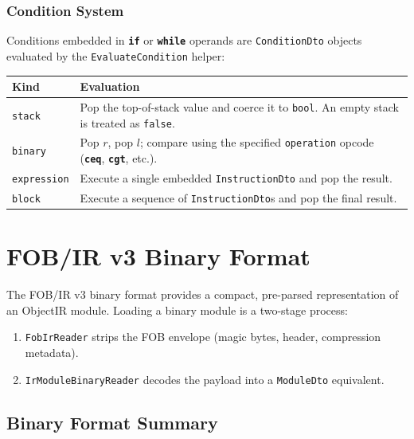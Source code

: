 \documentclass[11pt,a4paper]{article}
\newcommand{\code}[1]{\texttt{\small #1}}
\newcommand{\typename}[1]{\textcolor{typecolor}{\texttt{\small #1}}}
\newcommand{\opcode}[1]{\textbf{\texttt{#1}}}
\begin{document}
\subsubsection{Condition System}
\label{sec:conditions}

Conditions embedded in \opcode{if} or \opcode{while} operands are
\typename{ConditionDto} objects evaluated by the \code{EvaluateCondition}
helper:

\begin{longtable}{lp{10cm}}
  \toprule
  \textbf{Kind}       & \textbf{Evaluation} \\
  \midrule
  \endhead
  \code{stack}      & Pop the top-of-stack value and coerce it to \texttt{bool}.
                      An empty stack is treated as \texttt{false}. \\
  \code{binary}     & Pop $r$, pop $l$; compare using the specified
                      \code{operation} opcode (\opcode{ceq}, \opcode{cgt}, etc.). \\
  \code{expression} & Execute a single embedded \typename{InstructionDto} and pop
                      the result. \\
  \code{block}      & Execute a sequence of \typename{InstructionDto}s and pop the
                      final result. \\
  \bottomrule
\end{longtable}

\section{FOB/IR v3 Binary Format}
\label{sec:fob}

The FOB/IR v3 binary format provides a compact, pre-parsed representation of
an ObjectIR module. Loading a binary module is a two-stage process:

\begin{enumerate}[leftmargin=2em]
  \item \typename{FobIrReader} strips the FOB envelope (magic bytes, header,
    compression metadata).
  \item \typename{IrModuleBinaryReader} decodes the payload into a
    \typename{ModuleDto} equivalent.
\end{enumerate}

\subsection{Binary Format Summary}
\end{document}
